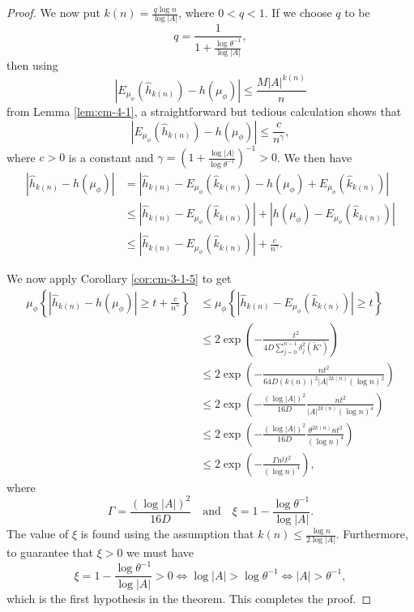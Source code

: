\begin{theorem}
\begin{proof}
		We now put $k(n) = \frac{q\log{n}}{\log{|A|}}$, where $0 < q < 1$. If we choose $q$ to be
		\[
			q = \frac{1}{1 + \frac{\log{\theta^{-1}}}{\log{|A|}}},
		\]
		then using
		\[
			|E_{\mu_\phi}(\hat{h}_{k(n)}) - h(\mu_\phi)| \leq \frac{M|A|^{k(n)}}{n}
		\]
		from Lemma \ref{lem:cm-4-1}, a straightforward but tedious calculation shows that
		\begin{equation}\label{fml:cm-8}
			|E_{\mu_\phi}(\hat{h}_{k(n)}) - h(\mu_\phi)| \leq \frac{c}{n^\gamma},
		\end{equation}
		where $c > 0$ is a constant and $\gamma = \left(1 + \frac{\log{|A|}}{\log{\theta^{-1}}}\right)^{-1} > 0$. We then have
		\begin{align*}
			|\hat{h}_{k(n)} - h(\mu_\phi)| &= |\hat{h}_{k(n)} - E_{\mu_\phi}(\hat{k}_{k(n)}) - h(\mu_\phi) + E_{\mu_\phi}(\hat{k}_{k(n)})| \\
				&\leq |\hat{h}_{k(n)} - E_{\mu_\phi}(\hat{k}_{k(n)})| + |h(\mu_\phi) - E_{\mu_\phi}(\hat{k}_{k(n)})| \\
				&\leq |\hat{h}_{k(n)} - E_{\mu_\phi}(\hat{k}_{k(n)})| + \frac{c}{n^\gamma}.
		\end{align*}
		
		We now apply Corollary \ref{cor:cm-3-1-5} to get
		\begin{align*}
			\mu_\phi\left\{\left|\hat{h}_{k(n)} - h(\mu_\phi)\right| \geq t + \frac{c}{n^\gamma}\right\} &\leq \mu_\phi\left\{\left|\hat{h}_{k(n)} - E_{\mu_\phi}(\hat{k}_{k(n)})\right| \geq t\right\} \\
				&\leq 2\exp\left(-\frac{t^2}{4D\sum_{j = 0}^{n - 1}{\delta_j^2(\tilde{K}')}}\right) \\
				&\leq 2\exp\left(-\frac{nt^2}{64D(k(n))^2|A|^{2k(n)}(\log{n})^2}\right) \\
				&\leq 2\exp\left(-\frac{(\log{|A|})^2}{16D} \frac{nt^2}{|A|^{2k(n)}(\log{n})^4}\right) \\
				&\leq 2\exp\left(-\frac{(\log{|A|})^2}{16D} \frac{\theta^{2k(n)} nt^2}{(\log{n})^4}\right) \\
				&\leq 2\exp\left(-\frac{\Gamma n^\xi t^2}{(\log{n})^4}\right),
		\end{align*}
		where
		\[
			\Gamma = \frac{(\log{|A|})^2}{16D} \quad \text{and} \quad \xi = 1 - \frac{\log{\theta^{-1}}}{\log{|A|}}.
		\]
		The value of $\xi$ is found using the assumption that $k(n) \leq \frac{\log{n}}{2\log{|A|}}$. Furthermore, to guarantee that $\xi > 0$ we must have
		\[
			\xi = 1 - \frac{\log{\theta^{-1}}}{\log{|A|}} > 0 \iff \log{|A|} > \log{\theta^{-1}} \iff |A| > \theta^{-1},
		\]
		which is the first hypothesis in the theorem. This completes the proof.
	\end{proof}
\end{theorem}

